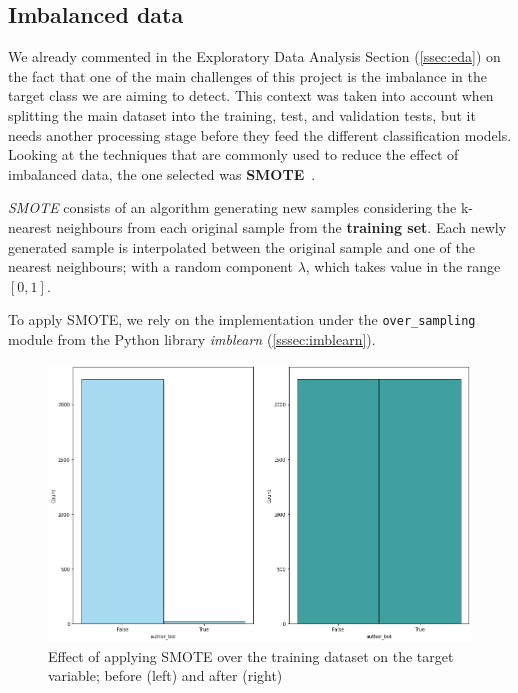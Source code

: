 \documentclass[a4paper, 12pt]{book}
\begin{document}
\subsection{Imbalanced data}
\label{ssec:imbalanced-data}


We already commented in the Exploratory Data Analysis Section (\ref{ssec:eda}) on the fact that one of the main challenges of this project is the imbalance in the target class we are aiming to detect. This context was taken into account when splitting the main dataset into the training, test, and validation tests, but it needs another processing stage before they feed the different classification models. Looking at the techniques that are commonly used to reduce the effect of imbalanced data, the one selected was \textbf{SMOTE}~\cite{chawla2002smote}. 

\textit{SMOTE} consists of an algorithm generating new samples considering the k-nearest neighbours from each original sample from the \textbf{training set}. Each newly generated sample is interpolated between the original sample and one of the nearest neighbours; with a random component $\lambda$, which takes value in the range $[0, 1]$.

To apply SMOTE, we rely on the implementation under the \texttt{over\_sampling} module from the Python library \textit{imblearn} (\ref{sssec:imblearn}).

\begin{figure}
 \centering
  \includegraphics[width=17cm, keepaspectratio]{img/author_bot_SMOTE_train.png}
  \caption{Effect of applying SMOTE over the training dataset on the target variable; before (left) and after (right)}
  \label{fig:smote-train}
\end{figure}
\end{document}

